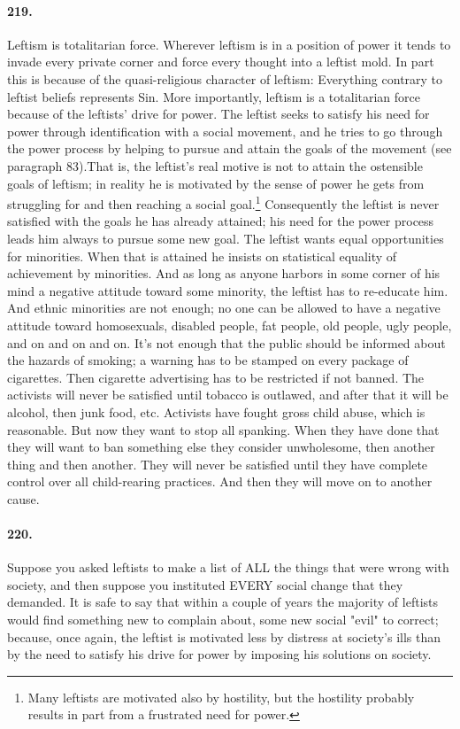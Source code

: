 \documentclass[12pt]{book}
\begin{document}
\paragraph{219.} Leftism is totalitarian force. Wherever leftism is in a position of power it tends to invade every private corner and force every thought into a leftist mold. In part this is because of the quasi-religious character of leftism: Everything contrary to leftist beliefs represents Sin. More importantly, leftism is a totalitarian force because of the leftists' drive for power. The leftist seeks to satisfy his need for power through identification with a social movement, and he tries to go through the power process by helping to pursue and attain the goals of the movement (see paragraph 83).That is, the leftist's real motive is not to attain the ostensible goals of leftism; in reality he is motivated by the sense of power he gets from struggling for and then reaching a social goal.\footnote{Many leftists are motivated also by hostility, but the hostility probably results in part from a frustrated need for power.} Consequently the leftist is never satisfied with the goals he has already attained; his need for the power process leads him always to pursue some new goal. The leftist wants equal opportunities for minorities. When that is attained he insists on statistical equality of achievement by minorities. And as long as anyone harbors in some corner of his mind a negative attitude toward some minority, the leftist has to re-educate him. And ethnic minorities are not enough; no one can be allowed to have a negative attitude toward homosexuals, disabled people, fat people, old people, ugly people, and on and on and on. It's not enough that the public should be informed about the hazards of smoking; a warning has to be stamped on every package of cigarettes. Then cigarette advertising has to be restricted if not banned. The activists will never be satisfied until tobacco is outlawed, and after that it will be alcohol, then junk food, etc.  Activists have fought gross child abuse, which is reasonable. But now they want to stop all spanking. When they have done that they will want to ban something else they consider unwholesome, then another thing and then another. They will never be satisfied until they have complete control over all child-rearing practices. And then they will move on to another cause.


\paragraph{220.} Suppose you asked leftists to make a list of ALL the things that were wrong with society, and then suppose you instituted EVERY social change that they demanded. It is safe to say that within a couple of years the majority of leftists would find something new to complain about, some new social "evil" to correct; because, once again, the leftist is motivated less by distress at society's ills than by the need to satisfy his drive for power by imposing his solutions on society.
\end{document}

